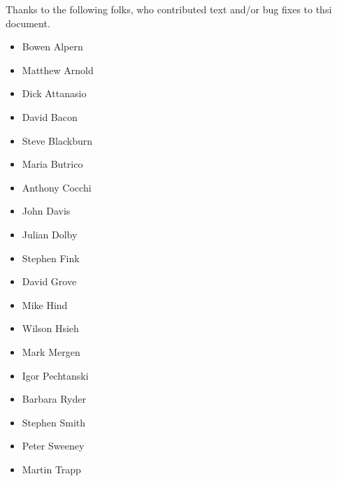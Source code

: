 Thanks to the following folks, who contributed text and/or bug fixes to
thsi document.

\begin{itemize}
\item Bowen Alpern
\item Matthew Arnold
\item Dick Attanasio
\item David Bacon
\item Steve Blackburn
\item Maria Butrico
\item Anthony Cocchi
\item John Davis
\item Julian Dolby
\item Stephen Fink
\item David Grove
\item Mike Hind
\item Wilson Hsieh
\item Mark Mergen
\item Igor Pechtanski
\item Barbara Ryder
\item Stephen Smith
\item Peter Sweeney
\item Martin Trapp
\end{itemize}

